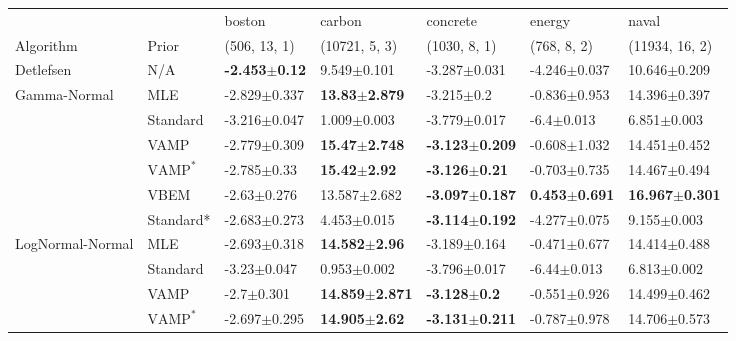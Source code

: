 \begin{tabular}{lllllll}
\toprule
                 &      &                    boston &                     carbon &                   concrete &                    energy &                      naval \\
Algorithm & Prior& (506, 13, 1)& (10721, 5, 3)& (1030, 8, 1)& (768, 8, 2)& (11934, 16, 2)\\
\midrule
Detlefsen & N/A &  \textbf{-2.453$\pm$0.12} &            9.549$\pm$0.101 &           -3.287$\pm$0.031 &          -4.246$\pm$0.037 &           10.646$\pm$0.209 \\
Gamma-Normal & MLE &          -2.829$\pm$0.337 &   \textbf{13.83$\pm$2.879} &             -3.215$\pm$0.2 &          -0.836$\pm$0.953 &           14.396$\pm$0.397 \\
                 & Standard &          -3.216$\pm$0.047 &            1.009$\pm$0.003 &           -3.779$\pm$0.017 &            -6.4$\pm$0.013 &            6.851$\pm$0.003 \\
                 & VAMP &          -2.779$\pm$0.309 &   \textbf{15.47$\pm$2.748} &  \textbf{-3.123$\pm$0.209} &          -0.608$\pm$1.032 &           14.451$\pm$0.452 \\
                 & $\text{VAMP}^*$ &           -2.785$\pm$0.33 &    \textbf{15.42$\pm$2.92} &   \textbf{-3.126$\pm$0.21} &          -0.703$\pm$0.735 &           14.467$\pm$0.494 \\
                 & VBEM &           -2.63$\pm$0.276 &           13.587$\pm$2.682 &  \textbf{-3.097$\pm$0.187} &  \textbf{0.453$\pm$0.691} &  \textbf{16.967$\pm$0.301} \\
                 & Standard* &          -2.683$\pm$0.273 &            4.453$\pm$0.015 &  \textbf{-3.114$\pm$0.192} &          -4.277$\pm$0.075 &            9.155$\pm$0.003 \\
LogNormal-Normal & MLE &          -2.693$\pm$0.318 &   \textbf{14.582$\pm$2.96} &           -3.189$\pm$0.164 &          -0.471$\pm$0.677 &           14.414$\pm$0.488 \\
                 & Standard &           -3.23$\pm$0.047 &            0.953$\pm$0.002 &           -3.796$\pm$0.017 &           -6.44$\pm$0.013 &            6.813$\pm$0.002 \\
                 & VAMP &            -2.7$\pm$0.301 &  \textbf{14.859$\pm$2.871} &    \textbf{-3.128$\pm$0.2} &          -0.551$\pm$0.926 &           14.499$\pm$0.462 \\
                 & $\text{VAMP}^*$ &          -2.697$\pm$0.295 &   \textbf{14.905$\pm$2.62} &  \textbf{-3.131$\pm$0.211} &          -0.787$\pm$0.978 &           14.706$\pm$0.573 \\

\end{tabular}
